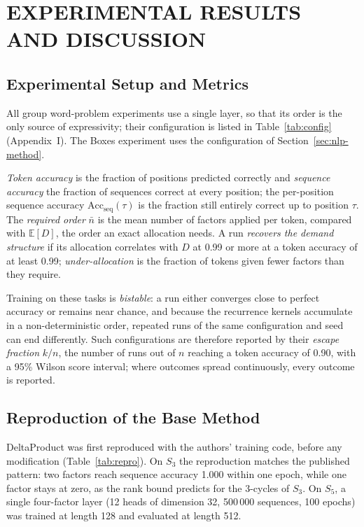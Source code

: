 \chapter{EXPERIMENTAL RESULTS AND DISCUSSION}
\label{chap:results}

\section{Experimental Setup and Metrics}
\label{sec:setup}
\label{sec:metrics}
All group word-problem experiments use a single layer, so that its order is the only source of expressivity; their configuration is listed in Table~\ref{tab:config} (Appendix~I). The Boxes experiment uses the configuration of Section~\ref{sec:nlp-method}.

\emph{Token accuracy} is the fraction of positions predicted correctly and \emph{sequence accuracy} the fraction of sequences correct at every position; the per-position sequence accuracy $\mathrm{Acc}_{\text{seq}}(\tau)$ is the fraction still entirely correct up to position $\tau$. The \emph{required order} $\bar n$ is the mean number of factors applied per token, compared with $\mathbb{E}[D]$, the order an exact allocation needs. A run \emph{recovers the demand structure} if its allocation correlates with $D$ at 0.99 or more at a token accuracy of at least 0.99; \emph{under-allocation} is the fraction of tokens given fewer factors than they require.

Training on these tasks is \emph{bistable}: a run either converges close to perfect accuracy or remains near chance, and because the recurrence kernels accumulate in a non-deterministic order, repeated runs of the same configuration and seed can end differently. Such configurations are therefore reported by their \emph{escape fraction} $k/n$, the number of runs out of $n$ reaching a token accuracy of 0.90, with a 95\% Wilson score interval; where outcomes spread continuously, every outcome is reported.

\section{Reproduction of the Base Method}
\label{sec:res-repro}
DeltaProduct was first reproduced with the authors' training code, before any modification (Table~\ref{tab:repro}). On $S_3$ the reproduction matches the published pattern: two factors reach sequence accuracy 1.000 within one epoch, while one factor stays at zero, as the rank bound predicts for the 3-cycles of $S_3$. On $S_5$, a single four-factor layer (12 heads of dimension 32, 500\,000 sequences, 100 epochs) was trained at length 128 and evaluated at length 512.

